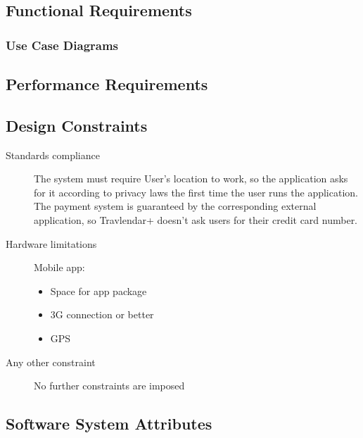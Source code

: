 \subsection{Functional Requirements}
	
	\subsubsection{Use Case Diagrams}
		
			
\subsection{Performance Requirements}
		
		
\subsection{Design Constraints}
		\begin{description}
			\item[Standards compliance]
			The system must require User’s location to work, so the application asks for it according to privacy laws the first time the user runs the application.
			The payment system is guaranteed by the corresponding external application, so Travlendar+ doesn’t ask users for their credit card number.

			\item[Hardware limitations]
			Mobile app:
			\begin{itemize}
			\item Space for app package
			\item 3G connection or better
			\item GPS
		\end{itemize}

			\item[Any other constraint]
			No further constraints are imposed
\end{description}
		
\subsection{Software System Attributes}
	
